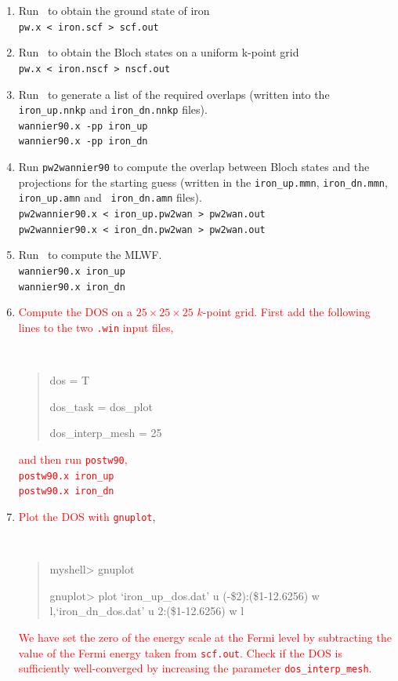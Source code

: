 \documentclass[a4paper,11pt,twoside]{article}
\def\tent#1{\textcolor{red}{#1}}     %
\begin{document}
\begin{enumerate}
\item Run \pwscf\ to obtain the ground state of iron\\
{\tt pw.x < iron.scf > scf.out}

\item Run \pwscf\ to obtain the Bloch states on a uniform k-point grid\\
{\tt pw.x < iron.nscf > nscf.out}

\item Run \wannier\ to generate a list of the required overlaps (written
  into the {\tt iron\_up.nnkp} and {\tt iron\_dn.nnkp} files).\\
{\tt wannier90.x -pp iron\_up}\\
{\tt wannier90.x -pp iron\_dn}

\item Run {\tt pw2wannier90} to compute the overlap between Bloch
  states and the projections for the starting guess (written in the
  {\tt iron\_up.mmn}, {\tt iron\_dn.mmn}, {\tt iron\_up.amn} and {\tt
  iron\_dn.amn} files).\\ 
{\tt pw2wannier90.x < iron\_up.pw2wan > pw2wan.out}\\
{\tt pw2wannier90.x < iron\_dn.pw2wan > pw2wan.out}

\item Run \wannier\ to compute the MLWF.\\
{\tt wannier90.x iron\_up}\\
{\tt wannier90.x iron\_dn}

\item \tent{Compute the DOS on a $25\times 25 \times 25$ $k$-point grid. First add the following
lines to the two {\tt .win} input files,}
{\tt
\begin{quote}
dos = T

dos\_task = dos\_plot

dos\_interp\_mesh = 25
\end{quote}
}

\tent{and then run {\tt postw90},\\
{\tt postw90.x iron\_up}\\
{\tt postw90.x iron\_dn}
}

\item \tent{Plot the DOS with {\tt gnuplot}},
%
{\tt
\begin{quote}
myshell> gnuplot

gnuplot> plot `iron\_up\_dos.dat' u (-\$2):(\$1-12.6256) w l,`iron\_dn\_dos.dat' u 2:(\$1-12.6256) w l

\end{quote} 
}

\tent{We have set the zero of the energy scale at the Fermi level by
  subtracting %
  the value of the Fermi energy taken from {\tt scf.out}.  Check if
  the DOS is sufficiently well-converged by increasing the parameter
  {\tt dos\_interp\_mesh}.  }

\end{enumerate}
\end{document}
